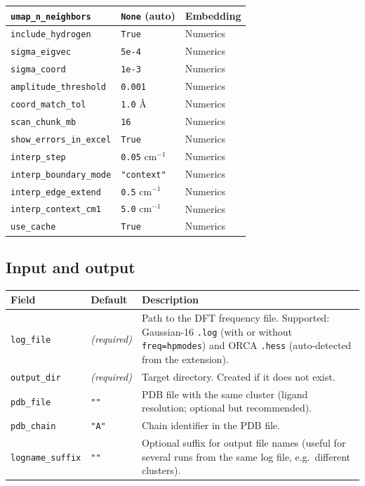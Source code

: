 \documentclass[11pt,a4paper,twoside]{article}
\theoremstyle{remark}
\begin{document}
\begin{longtable}{p{} p{} p{}}
\texttt{umap\_n\_neighbors}         & \texttt{None} (auto) & Embedding \\
\midrule
\texttt{include\_hydrogen}          & \texttt{True}        & Numerics \\
\texttt{sigma\_eigvec}              & \texttt{5e-4}        & Numerics \\
\texttt{sigma\_coord}               & \texttt{1e-3}        & Numerics \\
\texttt{amplitude\_threshold}       & \texttt{0.001}       & Numerics \\
\texttt{coord\_match\_tol}          & \texttt{1.0} \AA     & Numerics \\
\texttt{scan\_chunk\_mb}            & \texttt{16}          & Numerics \\
\texttt{show\_errors\_in\_excel}    & \texttt{True}        & Numerics \\
\texttt{interp\_step}               & \texttt{0.05} cm$^{-1}$ & Numerics \\
\texttt{interp\_boundary\_mode}     & \texttt{"context"}   & Numerics \\
\texttt{interp\_edge\_extend}       & \texttt{0.5} cm$^{-1}$ & Numerics \\
\texttt{interp\_context\_cm1}       & \texttt{5.0} cm$^{-1}$ & Numerics \\
\texttt{use\_cache}                 & \texttt{True}        & Numerics \\
\bottomrule
\end{longtable}



\subsection{Input and output}

\begin{longtable}{p{} p{} p{}}
\toprule
\textbf{Field} & \textbf{Default} & \textbf{Description} \\
\midrule
\endhead
\texttt{log\_file}      & \emph{(required)} & Path to the DFT
  frequency file. Supported: Gaussian-16 \texttt{.log} (with or
  without \texttt{freq=hpmodes}) and ORCA \texttt{.hess} (auto-detected
  from the extension). \\
\texttt{output\_dir}    & \emph{(required)} & Target directory.
  Created if it does not exist. \\
\texttt{pdb\_file}      & \texttt{""}     & PDB file with the same
  cluster (ligand resolution; optional but recommended). \\
\texttt{pdb\_chain}     & \texttt{"A"}     & Chain identifier in
  the PDB file. \\
\texttt{logname\_suffix} & \texttt{""}     & Optional suffix for
  output file names (useful for several runs from the same log
  file, e.g.\ different clusters). \\
\bottomrule
\end{longtable}
\end{document}
